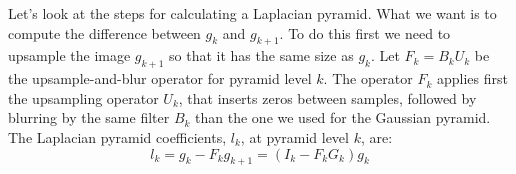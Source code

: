 Let's look at the steps for calculating a Laplacian pyramid.
What we want is to compute the difference between $g_k$ and  $g_{k+1}$. To do this first we need to upsample the image $g_{k+1}$ so that it has the same size as $g_k$. Let $F_k = B_k U_k$ be the upsample-and-blur operator for pyramid level $k$.  The operator $F_k$ applies first the upsampling operator $U_k$, that inserts zeros between samples, followed by blurring by the same filter $B_k$ than the one we used for the Gaussian pyramid. The Laplacian pyramid coefficients, $l_k$, at pyramid level $k$, are:
\begin{equation}
	l_{k} =  g_k - F_k g_{k+1} =  (I_k - F_k G_k) g_{k}
\end{equation}

